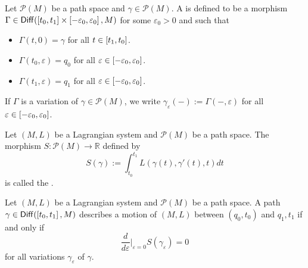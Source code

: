 \begin{definition}[Variation]
	Let $\mathcal{P}(M)$ be a path space and $\gamma \in \mathcal{P}(M)$. A  is defined to be a morphism $\Gamma \in \mathsf{Diff}(\intcc[0]{t_0,t_1} \times \intcc[0]{-\varepsilon_0,\varepsilon_0},M)$ for some $\varepsilon_0 > 0$ and such that
	\begin{itemize}[wide=0pt]
		\item $\Gamma(t,0) = \gamma$ for all $t \in \intcc[0]{t_1,t_0}$.
		\item $\Gamma(t_0,\varepsilon) = q_0$ for all $\varepsilon \in \intcc[0]{-\varepsilon_0,\varepsilon_0}$.
		\item $\Gamma(t_1,\varepsilon) = q_1$ for all $\varepsilon \in \intcc[0]{-\varepsilon_0,\varepsilon_0}$.
	\end{itemize}
\end{definition}

\begin{remark}
	If $\Gamma$ is a variation of $\gamma \in \mathcal{P}(M)$, we write $\gamma_\varepsilon(-) := \Gamma(-,\varepsilon)$ for all $\varepsilon \in \intcc[0]{-\varepsilon_0,\varepsilon_0}$.
\end{remark}

\begin{definition}
	Let $(M,L)$ be a Lagrangian system and $\mathcal{P}(M)$ be a path space. The morphism $S : \mathcal{P}(M) \to \mathbb{R}$ defined by
	\begin{equation*}
		S(\gamma) := \int_{t_0}^{t_1} L(\gamma(t),\gamma'(t),t) dt
	\end{equation*}
	\noindent is called the .
\end{definition}

\begin{axiom}
	Let $(M,L)$ be a Lagrangian system and $\mathcal{P}(M)$ be a path space. A path $\gamma \in \mathsf{Diff}(\intcc[0]{t_0,t_1},M)$ describes a motion of $(M,L)$ between $(q_0,t_0)$ and $q_1,t_1$ if and only if 
	\begin{equation}
		\frac{d}{d\varepsilon}\bigg\vert_{\varepsilon = 0} S(\gamma_\varepsilon) = 0
	\end{equation}
	\noindent for all variations $\gamma_\varepsilon$ of $\gamma$.
\end{axiom}

